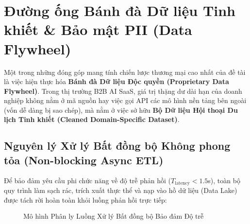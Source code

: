\section{Đường ống Bánh đà Dữ liệu Tinh khiết \& Bảo mật PII (Data Flywheel)}
\label{sec:data_flywheel_pipeline}

Một trong những đóng góp mang tính chiến lược thương mại cao nhất của đề tài là việc hiện thực hóa \textbf{Bánh đà Dữ liệu Độc quyền (Proprietary Data Flywheel)}. Trong thị trường B2B AI SaaS, giá trị thặng dư dài hạn của doanh nghiệp không nằm ở mã nguồn hay việc gọi API các mô hình nền tảng bên ngoài (vốn dễ dàng bị sao chép), mà nằm ở việc sở hữu \textbf{Bộ Dữ liệu Hội thoại Du lịch Tinh khiết (Cleaned Domain-Specific Dataset)}.

\subsection{Nguyên lý Xử lý Bất đồng bộ Không phong tỏa (Non-blocking Async ETL)}
\label{subsec:async_etl}

Để bảo đảm yêu cầu phi chức năng về độ trễ phản hồi ($T_{\text{latency}} < 1.5$s), toàn bộ quy trình làm sạch rác, trích xuất thực thể và nạp vào hồ dữ liệu (Data Lake) được tách rời hoàn toàn khỏi luồng phản hồi trực tiếp:

\begin{figure}[h!]
\centering
{}
\caption{Mô hình Phân ly Luồng Xử lý Bất đồng bộ Bảo đảm Độ trễ}
\label{fig:async_etl_flywheel}
\end{figure}

